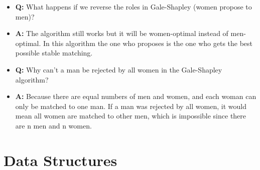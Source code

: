 \documentclass[11pt,a4paper]{article}
\begin{document}
\begin{multicols}{2}
\begin{itemize}
    \item \textbf{Q:} What happens if we reverse the roles in Gale-Shapley (women propose to men)?
    \item \textbf{A:} The algorithm still works but it will be women-optimal instead of men-optimal. In this algorithm the one who proposes is the one who gets the best possible stable matching.

    \item \textbf{Q:} Why can't a man be rejected by all women in the Gale-Shapley algorithm?
    \item \textbf{A:} Because there are equal numbers of men and women, and each woman can only be matched to one man. If a man was rejected by all women, it would mean all women are matched to other men, which is impossible since there are n men and n women.
\end{itemize}

\section{Data Structures}

\end{multicols}
\end{document}
